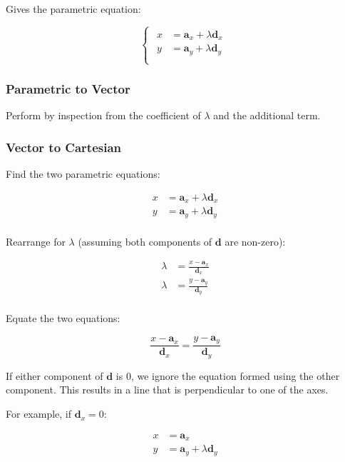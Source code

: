 \documentclass[a4paper,11pt]{article}
\newcommand{\bb}{\boldsymbol}
\begin{document}
Gives the parametric equation:

$$
\begin{cases}
\begin{aligned}
x & = \bb{a}_x + \lambda \bb{d}_x \\
y & = \bb{a}_y + \lambda \bb{d}_y \\
\end{aligned}
\end{cases}
$$


\subsubsection{Parametric to Vector}

Perform by inspection from the coefficient of $\lambda$ and the additional
term.


\subsubsection{Vector to Cartesian}

Find the two parametric equations:

$$
\begin{aligned}
x & = \bb{a}_x + \lambda \bb{d}_x \\
y & = \bb{a}_y + \lambda \bb{d}_y \\
\end{aligned}
$$

Rearrange for $\lambda$ (assuming both components of $\bb{d}$ are non-zero):

$$
\begin{aligned}
\lambda & = \frac{x - \bb{a}_x}{\bb{d}_x} \\
\lambda & = \frac{y - \bb{a}_y}{\bb{d}_y} \\
\end{aligned}
$$

Equate the two equations:

$$
\frac{x - \bb{a}_x}{\bb{d}_x} = \frac{y - \bb{a}_y}{\bb{d}_y}
$$

If either component of $\bb{d}$ is 0, we ignore the equation formed using the
other component.  This results in a line that is perpendicular to one of the
axes.

For example, if $\bb{d}_x = 0$:

$$
\begin{aligned}
x & = \bb{a}_x \\
y & = \bb{a}_y + \lambda \bb{d}_y \\
\end{aligned}
$$
\end{document}
